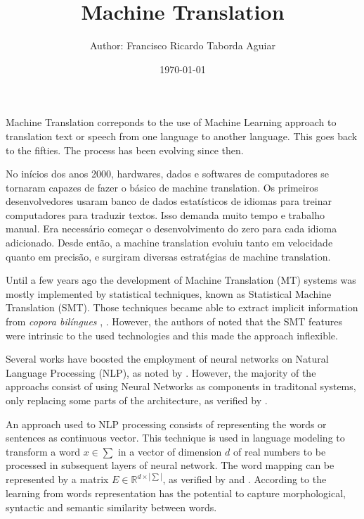 \documentclass[a4paper]{article}
\title{
    Machine Translation\\
}
\author{
    \small{Author: Francisco Ricardo Taborda Aguiar}\\
}
\date{\today}
\begin{document}
    \maketitle

    Machine Translation correponds to the use of Machine Learning 
    approach to translation text or speech from one language to 
    another language. 
    This goes back to the fifties. The process has been evolving since then.


    No inícios dos anos 2000, hardwares, dados e softwares de computadores se tornaram 
    capazes de fazer o básico de machine translation. Os primeiros desenvolvedores usaram 
    banco de dados estatísticos de idiomas para treinar computadores para traduzir textos. 
    Isso demanda muito tempo e trabalho manual. Era necessário começar o desenvolvimento do 
    zero para cada idioma adicionado. Desde então, a machine translation evoluiu tanto em 
    velocidade quanto em precisão, e surgiram diversas estratégias de machine translation.


    Until a few years ago the development of Machine Translation (MT) 
    systems was mostly implemented by statistical techniques, known as 
    Statistical Machine Translation (SMT).
    Those techniques became able to extract implicit information from
    \emph{copora bil\'ingues} , \cite{brown:1993}.
    However, the authors of \cite{maruf:2021} noted that the SMT features
    were intrinsic to the used technologies and this made the approach
    inflexible. 
    
    Several works have boosted the employment of neural 
    networks on Natural Language Processing (NLP), as noted by 
    \cite{goldberg:2016}.
    However, the majority of the approachs consist of using Neural Networks
    as components in traditonal systems, only replacing some parts of the
    architecture, as verified by \cite{stahlberg:2020}.

    An approach used to NLP processing consists of representing the words 
    or sentences as continuous vector. This technique is used in language 
    modeling to transform a word $x \in \sum$ in a vector of dimension 
    $d$ of real numbers to be processed in subsequent layers of neural network.
    The word mapping can be represented by a matrix  
    $E \in \mathbb{R} ^{d \times |\sum|}$, as verified by \cite{collobert:2008} 
    and \cite{stahlberg:2020}.
    According to \cite{stahlberg:2020} the learning from words representation 
    has the potential to capture morphological, syntactic and semantic 
    similarity between words.    
\end{document}
